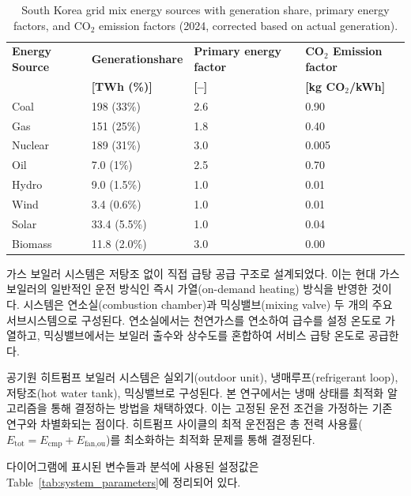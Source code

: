 \documentclass[final,5p,times,twocolumn,authoryear]{elsarticle}
\begin{document}
\begin{table}[htbp]
\centering
\caption{South Korea grid mix energy sources with generation share, primary energy factors, and CO$_2$ emission factors (2024, corrected based on actual generation).}
\label{tab:grid_mix_korea}
\renewcommand{\arraystretch}{1.2}
\small
\begin{tabularx}{\columnwidth}{l X X X}
\toprule
\textbf{Energy Source} & \textbf{Generationshare} & \textbf{Primary energy factor} & \textbf{CO$_2$ Emission factor} \\
 & \textbf{[TWh (\%)]} & \textbf{[--]} & \textbf{[kg CO$_2$/kWh]} \\
\midrule
Coal & 198 (33\%) & 2.6 & 0.90 \\
Gas & 151 (25\%) & 1.8 & 0.40 \\
Nuclear & 189 (31\%) & 3.0 & 0.005 \\
Oil & 7.0 (1\%) & 2.5 & 0.70 \\
Hydro & 9.0 (1.5\%) & 1.0 & 0.01 \\
Wind & 3.4 (0.6\%) & 1.0 & 0.01 \\
Solar & 33.4 (5.5\%) & 1.0 & 0.04 \\
Biomass & 11.8 (2.0\%) & 3.0 & 0.00 \\
\bottomrule
\end{tabularx}
\end{table}

가스 보일러 시스템은 저탕조 없이 직접 급탕 공급 구조로 설계되었다. 이는 현대 가스 보일러의 일반적인 운전 방식인 즉시 가열(on-demand heating) 방식을 반영한 것이다. 시스템은 연소실(combustion chamber)과 믹싱밸브(mixing valve) 두 개의 주요 서브시스템으로 구성된다. 연소실에서는 천연가스를 연소하여 급수를 설정 온도로 가열하고, 믹싱밸브에서는 보일러 출수와 상수도를 혼합하여 서비스 급탕 온도로 공급한다.

공기원 히트펌프 보일러 시스템은 실외기(outdoor unit), 냉매루프(refrigerant loop), 저탕조(hot water tank), 믹싱밸브로 구성된다. 본 연구에서는 냉매 상태를 최적화 알고리즘을 통해 결정하는 방법을 채택하였다. 이는 고정된 운전 조건을 가정하는 기존 연구와 차별화되는 점이다. 히트펌프 사이클의 최적 운전점은 총 전력 사용률($E_{\text{tot}} = E_{\text{cmp}} + E_{\text{fan,ou}}$)를 최소화하는 최적화 문제를 통해 결정된다.

다이어그램에 표시된 변수들과 분석에 사용된 설정값은 Table~\ref{tab:system_parameters}에 정리되어 있다.
\end{document}

